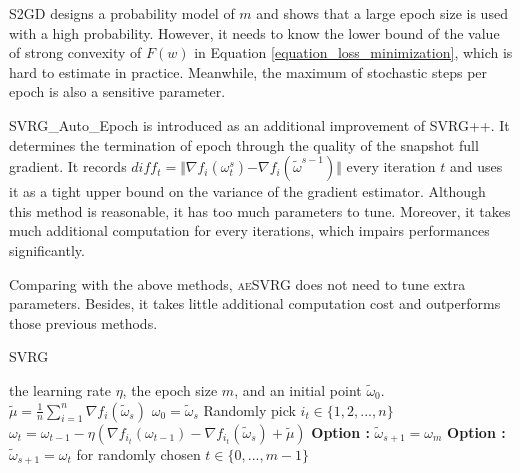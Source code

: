 \documentclass[conference]{IEEEtran}
\begin{document}
S2GD designs a probability model of $m$ and shows that a large epoch size is used with a high probability. However, it needs to know the lower bound of the value of strong convexity of $F(w)$ in Equation \ref{equation_loss_minimization}, which is hard to estimate in practice. Meanwhile, the maximum of stochastic steps per epoch is also a sensitive parameter. 

SVRG\_Auto\_Epoch is introduced as an additional improvement of SVRG++. It determines the termination of epoch through the quality of the snapshot full gradient. It records $diff_t = \Vert\nabla f_{i}(\omega_t^s)\mathrm{-}\nabla f_{i}(\tilde{\omega}^{s-1})\Vert$ every iteration $t$ and uses it as a tight upper bound on the variance of the gradient estimator. Although this method is reasonable, it has too much parameters to tune. Moreover, it takes much additional computation for every iterations, which impairs performances significantly. 

Comparing with the above methods, \textsc{aeSVRG}  does not need to tune extra parameters. Besides, it takes little additional computation cost and outperforms those previous methods.


 \begin{algorithm}[t]
 	\caption{\textsc{SVRG}}
	\label{SVRG}
	\begin{algorithmic}[1]
	\Require the learning rate $\eta$,  the epoch size $m$, and an initial point $\tilde{\omega}_0$.
		\State $\tilde{\mu} = \frac{1}{n}\sum\limits_{i=1}^{n}\nabla f_{i}(\tilde{\omega}_{s})$
		\State $\omega_0 = \tilde{\omega}_s$
			\State Randomly pick $i_t\in\{1, 2, ..., n\}$
			\State $\omega_t = \omega_{t-1} - \eta(\nabla f_{i_t}(\omega_{t-1}) - \nabla f_{i_t}(\tilde{\omega}_s)+\tilde{\mu})$
		\EndFor
		\State \textbf{Option \uppercase\expandafter{}:} $\tilde{\omega}_{s+1} = \omega_{m}$
		\State \textbf{Option \uppercase\expandafter{}:} $\tilde{\omega}_{s+1} = \omega_{t}$ for randomly chosen $t \in \{0, ... ,m - 1\}$ 
	\EndFor
	\end{algorithmic}
\end{algorithm}
\end{document}
